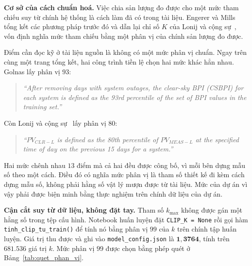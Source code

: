 \documentclass[12pt, a4paper]{report}
\begin{document}
\textbf{Cơ sở của cách chuẩn hoá.} Việc chia sản lượng đo được cho một mức tham chiếu suy từ
chính hệ thống là cách làm đã có trong tài liệu. Engerer và Mills~\cite{engerer2014kpv} tổng
kết các phương pháp trước đó và dẫn lại chỉ số $K$ của Lonij và cộng sự~\cite{lonij2012tucson},
vốn định nghĩa mức tham chiếu bằng một phân vị của chính sản lượng đo được.

Điểm cần đọc kỹ ở tài liệu nguồn là không có một mức phân vị chuẩn. Ngay trên cùng
một trang tổng kết, hai công trình tiền lệ chọn hai mức khác hẳn nhau. Golnas lấy
phân vị $93$:

\begin{quote}\small
\textit{``After removing days with system outages, the clear-sky BPI (CSBPI) for each system is defined as the 93rd percentile of the set of BPI values in the training set.''}
\end{quote}

Còn Lonij và cộng sự~\cite{lonij2012tucson} lấy phân vị $80$:

\begin{quote}\small
\textit{``$PV_{CLR-L}$ is defined as the 80th percentile of $PV_{MEAS-L}$ at the specified time of day on the previous 15 days for a system.''}
\end{quote}


Hai mức chênh nhau $13$ điểm mà cả hai đều được công bố, vì mỗi bên dựng mẫu số theo một cách.
Điều đó có nghĩa mức phân vị là tham số thiết kế đi kèm cách dựng mẫu số, không phải
hằng số vật lý mượn được từ tài liệu. Mức của dự án vì vậy phải được biện minh bằng thực
nghiệm trên chính dữ liệu của dự án.

\textbf{Cận cắt suy từ dữ liệu, không đặt tay.} Tham số $k_{\max}$ không được gán một hằng số
trong tệp cấu hình. Notebook huấn luyện đặt \texttt{CLIP\_K = None} rồi gọi hàm
\texttt{tinh\_clip\_tu\_train()} để tính nó bằng phân vị $99$ của $k$ trên chính tập huấn luyện.
Giá trị thu được và ghi vào \texttt{model\_config.json} là $\mathbf{1{,}3764}$, tính trên
$681.536$ giá trị $k$. Mức phân vị $99$ được chọn bằng phép quét ở
Bảng~\ref{tab:quet_phan_vi}.
\end{document}
